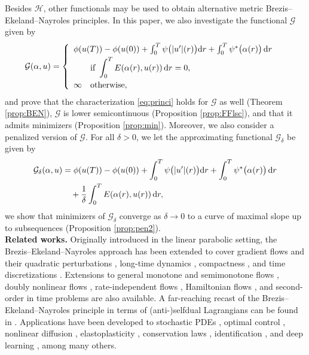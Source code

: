 \documentclass[reqno]{amsart}
\newcommand{\disp}{\displaystyle}
\newcommand{\dr}{{\rm d} r}
\newcommand{\GG}{{\mathcal G}}
\newcommand{\HH}{{\mathcal H}}
\begin{document}
Besides $\HH$, other functionals may be used to obtain alternative metric
Brezis--Ekeland--Nayroles principles. In this paper, we also
investigate  the
functional  $\GG$ given by 
\begin{align*}
     \GG(\alpha,u) &=
     \left\{
     \begin{array}{l}
      \phi(u(T))-\phi(u(0)) + \int_0^T 
       \psi\big(|u'|(r)\big) \dr +  \int_0^T  \psi^*\big(\alpha
       (r)\big)\, \dr\\[1mm]
       \qquad \text{if} \ \disp \int_0^T E
                            (\alpha(r),u(r))\, \dr=0,\\[3mm]
       \infty\quad \text{otherwise},
     \end{array}
  \right.
\end{align*}
and prove that the characterization \eqref{eq:princi} holds for $\GG$
 as  well (Theorem \ref{prop:BEN}), $\GG$ is lower semicontinuous (Proposition \ref{prop:FFlsc}), and that it
  admits minimizers (Proposition \ref{prop:min}). Moreover, we also
  consider a penalized version of $\GG$. For all $\delta >0$, we let
  the approximating functional $\GG_\delta$ be given by 
  \begin{align*}
    \GG_\delta(\alpha,u) &=\phi(u(T))-\phi(u(0)) + \int_0^T 
       \psi\big(|u'|(r)\big) \dr +  \int_0^T  \psi^*\big(\alpha
       (r)\big)\, \dr \\
                                             &\quad +\frac{1}{\delta}\int_0^T E
                            (\alpha(r),u(r))\, \dr,
                                \end{align*}
                                 we
                                show that minimizers of $\GG_\delta$ converge as $\delta \to 0$ to
a curve of maximal slope up to subsequences (Proposition \ref{prop:pen2}).\\ 
 
\textbf{Related works.} Originally introduced in the linear parabolic
setting, the Brezis--Ekeland--Nayroles approach has been extended to cover gradient flows
\cite{Ghoussoub-Tzou04} and their quadratic perturbations
\cite{Ghoussoub-McCann04}, long-time dynamics \cite{Lemaire96},
compactness \cite{Visintin22}, and
time discretizations \cite{be2}. Extensions to general
monotone and semimonotone flows  \cite{Visintin13,Visintin16},
doubly nonlinear flows  \cite{be,Visintin11, Visintin21}, rate-independent flows
\cite{Visintin13b}, Hamiltonian flows \cite{Buliga, Ghoussoub, Ghoussoub2,
  Ghoussoub3},  and second-order in time problems  \cite{Mabrouk01,Mabrouk03}  are
also available. A far-reaching recast of the
Brezis--Ekeland--Nayroles principle in terms  of   (anti-)selfdual
Lagrangians can be found in \cite{Ghoussoub08}. Applications have been developed to stochastic PDEs
\cite{Barbu,Boroushaki}, optimal control \cite{Barbu12,portinale}, nonlinear
diffusion \cite{Marinoschi,Poliakovsky}, elastoplasticity
\cite{Cao,plas}, conservation laws \cite{Poliakovsky2}, identification
\cite{Barbu-Kunisch95}, and deep learning
\cite{Carini}, among many others.
\end{document}
